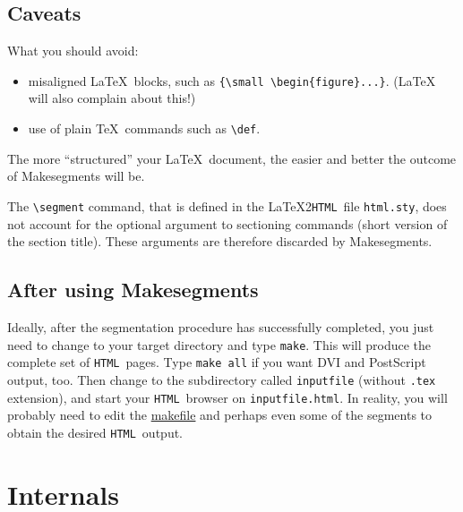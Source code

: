 \documentclass[a4paper,12pt]{article}
\newcommand{\htm}{{\tt HTML}}
\newcommand{\lhh}{{\rm \LaTeX2}\htm}
\begin{document}
\begin{description}
\end{description}

\subsection{Caveats}
\label{caveats}

What you should avoid:

\begin{itemize}
\item misaligned \LaTeX\ blocks, such as \verb:{\small \begin{figure}...}:.
    (\LaTeX
    will also complain about this!)
\item use of plain \TeX\ commands such as \verb+\def+.
\end{itemize}

The more ``structured'' your \LaTeX\ document, the easier and better
the outcome of Makesegments will be.

The \verb+\segment+ command, that is
defined in the \lhh\ file \verb+html.sty+, does not account for the
optional argument to sectioning commands (short version of the section
title).  These arguments are
therefore discarded by Makesegments.

\subsection{After using Makesegments}
\label{after}

Ideally, after the segmentation procedure has successfully completed,
you just need to change to your target directory and type
\verb:make:. This will produce the complete
set of \htm\ pages. Type \verb:make all: if you want DVI and
PostScript output, too.
 Then change to the
subdirectory called \verb:inputfile: (without \verb:.tex: extension),
and start your \htm\ browser on \verb:inputfile.html:\index{html
  output@\htm\ output}. In reality,
you will probably need to edit the 
\hyperref{Makefile}{Makefile (see }{)}{makefile} and perhaps even some of
the segments to obtain the desired \htm\ output.

\section{Internals}
\label{internals}
\end{document}
